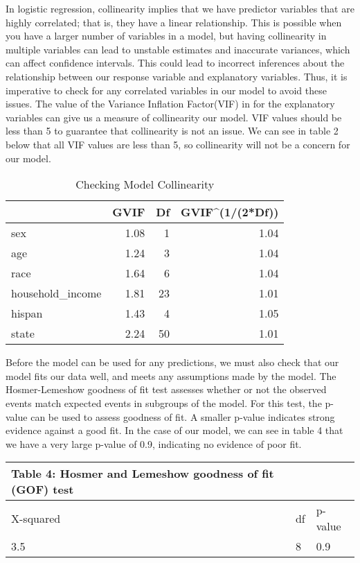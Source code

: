\documentclass[
]{article}
\begin{document}
In logistic regression, collinearity implies that we have predictor variables that are highly correlated; that is, they have a linear relationship. This is possible when you have a larger number of variables in a model, but having collinearity in multiple variables can lead to unstable estimates and inaccurate variances, which can affect confidence intervals. This could lead to incorrect inferences about the relationship between our response variable and explanatory variables. Thus, it is imperative to check for any correlated variables in our model to avoid these issues. The value of the Variance Inflation Factor(VIF) in for the explanatory variables can give us a measure of collinearity our model. VIF values should be less than 5 to guarantee that collinearity is not an issue. We can see in table 2 below that all VIF values are less than 5, so collinearity will not be a concern for our model.

\begin{table}

\caption{\label{tab:unnamed-chunk-2}Checking Model Collinearity}
\centering
\begin{tabular}[t]{l|r|r|r}
\hline
  & GVIF & Df & GVIF\textasciicircum{}(1/(2*Df))\\
\hline
sex & 1.08 & 1 & 1.04\\
\hline
age & 1.24 & 3 & 1.04\\
\hline
race & 1.64 & 6 & 1.04\\
\hline
household\_income & 1.81 & 23 & 1.01\\
\hline
hispan & 1.43 & 4 & 1.05\\
\hline
state & 2.24 & 50 & 1.01\\
\hline
\end{tabular}
\end{table}

Before the model can be used for any predictions, we must also check that our model fits our data well, and meets any assumptions made by the model. The Hosmer-Lemeshow goodness of fit test assesses whether or not the observed events match expected events in subgroups of the model. For this test, the p-value can be used to assess goodness of fit. A smaller p-value indicates strong evidence against a good fit. In the case of our model, we can see in table 4 that we have a very large p-value of 0.9, indicating no evidence of poor fit.

\begin{longtable}[]{@{}lll@{}}
\toprule
Table 4: Hosmer and Lemeshow goodness of fit (GOF) test & &\tabularnewline
\midrule
\endhead
X-squared & df & p-value\tabularnewline
3.5 & 8 & 0.9\tabularnewline
\bottomrule
\end{longtable}
\end{document}

